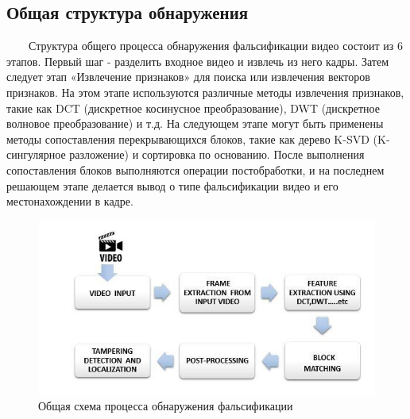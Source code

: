 \documentclass[12pt]{article}
\begin{document}
     \subsection {Общая структура обнаружения}
        $\qquad$Структура общего процесса обнаружения фальсификации видео состоит из 6 этапов.
        \newline
        Первый шаг - разделить входное видео и извлечь из него кадры. Затем следует этап «Извлечение признаков» для поиска или извлечения векторов признаков. На этом этапе используются различные методы извлечения признаков, такие как DCT (дискретное косинусное преобразование), DWT (дискретное волновое преобразование) и т.д. На следующем этапе могут быть применены методы сопоставления перекрывающихся блоков, такие как дерево K-SVD (K-сингулярное разложение) и сортировка по основанию. После выполнения сопоставления блоков выполняются операции постобработки, и на последнем решающем этапе делается вывод о типе фальсификации видео и его местонахождении в кадре.
        \begin{figure}[h!]
            \centering
            \includegraphics[width = 300 pt] {15.jpg}
            \caption{Общая схема процесса обнаружения фальсификации}
        \end{figure}
        \newline
        \newline
\end{document}
